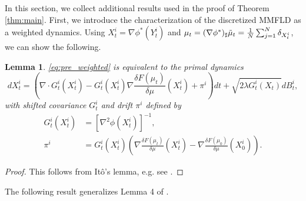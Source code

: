 \documentclass{article}
\newtheorem{lemma}[theorem]{Lemma}
\begin{document}
In this section, we collect additional results used in the proof of Theorem \ref{thm:main}. First, we introduce the characterization of the discretized MMFLD as a weighted dynamics. Using $X_t^i = \nabla\phi^*(Y_t^i)$ and $\mu_t = (\nabla\phi^*)_\sharp \Tilde{\mu}_t = \frac{1}{N}\sum_{j=1}^N\delta_{X_t^i}$, we can show the following.
\begin{lemma}\label{lem:weighted}
\eqref{eq:pre_weighted} is equivalent to the primal dynamics 
\begin{equation}\label{eq:weighted}
    dX_t^i = \left(\nabla \cdot G_t^i(X_t^i) - G_t^i(X_t^i)\nabla \frac{\delta F(\mu_t)}{\delta\mu}(X_t^i) + \pi^i\right)dt + \sqrt{2\lambda G_t^i(X_t)}dB_t^i,
\end{equation}
with \emph{shifted} covariance $G_t^i$ and drift $\pi^i$ defined by \begin{align*}
G_t^i(X_t^i) &= [\nabla^2\phi(X_t^i)]^{-1},\\
        \pi^i &= G_t^i(X_t^i)\left(\nabla \frac{\delta F(\mu_t)}{\delta\mu}(X_t^i) - \nabla \frac{\delta F(\mu_0)}{\delta\mu}(X_0^i)\right).
    \end{align*}
\end{lemma}
\begin{proof}
    This follows from It\^o's lemma, e.g. see \citet[Appendix C]{jiang2021mirror}.
\end{proof}

The following result generalizes Lemma 4 of \citet{jiang2021mirror}.
\end{document}
